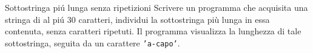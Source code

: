 \begin{labex}{Sottostringa pi\'u lunga senza ripetizioni}
Scrivere un programma che acquisita una stringa di al pi\'u 30 caratteri, individui la sottostringa pi\`u lunga in essa contenuta, senza caratteri ripetuti. Il programma visualizza la lunghezza di tale sottostringa, seguita da un carattere \texttt{'a-capo'}.

\begin{labexinout}
\end{labexinout}

\begin{labexcases}


\end{labexcases}


\end{labex}

